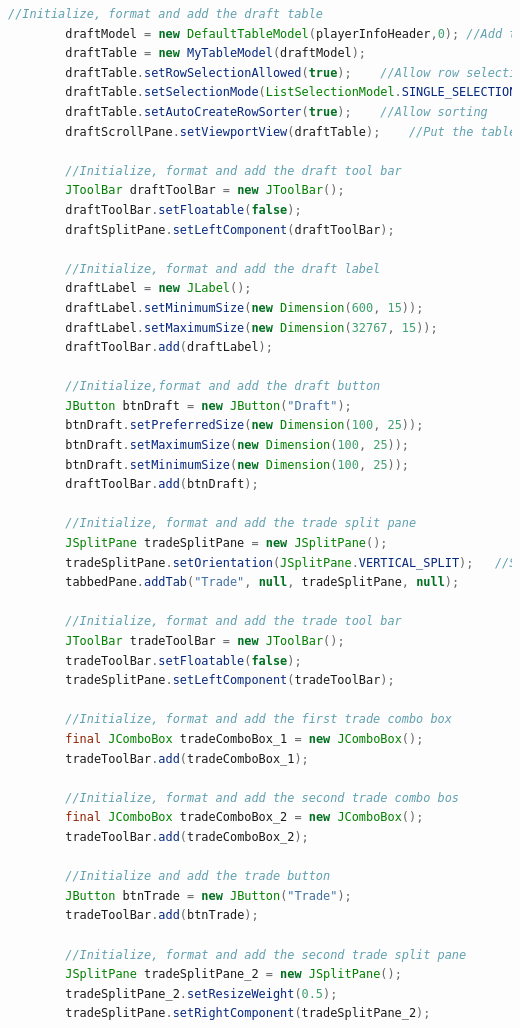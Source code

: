 \documentclass[12pt]{report}
\begin{document}
\begin{singlespace}
\begin{lstlisting}[language=Java,label=some-code,caption={GUI.java}]
		//Initialize, format and add the draft table
		draftModel = new DefaultTableModel(playerInfoHeader,0);	//Add the header but no rows
		draftTable = new MyTableModel(draftModel);
		draftTable.setRowSelectionAllowed(true);	//Allow row selection
		draftTable.setSelectionMode(ListSelectionModel.SINGLE_SELECTION);	//Allow only one row selection at a time
		draftTable.setAutoCreateRowSorter(true);	//Allow sorting
		draftScrollPane.setViewportView(draftTable);	//Put the table into the scroll pane
		
		//Initialize, format and add the draft tool bar
		JToolBar draftToolBar = new JToolBar();
		draftToolBar.setFloatable(false);
		draftSplitPane.setLeftComponent(draftToolBar);
		
		//Initialize, format and add the draft label
		draftLabel = new JLabel();
		draftLabel.setMinimumSize(new Dimension(600, 15));
		draftLabel.setMaximumSize(new Dimension(32767, 15));
		draftToolBar.add(draftLabel);
		
		//Initialize,format and add the draft button
		JButton btnDraft = new JButton("Draft");
		btnDraft.setPreferredSize(new Dimension(100, 25));
		btnDraft.setMaximumSize(new Dimension(100, 25));
		btnDraft.setMinimumSize(new Dimension(100, 25));
		draftToolBar.add(btnDraft);
		
		//Initialize, format and add the trade split pane
		JSplitPane tradeSplitPane = new JSplitPane();
		tradeSplitPane.setOrientation(JSplitPane.VERTICAL_SPLIT);	//Split vertically
		tabbedPane.addTab("Trade", null, tradeSplitPane, null);
		
		//Initialize, format and add the trade tool bar
		JToolBar tradeToolBar = new JToolBar();
		tradeToolBar.setFloatable(false);
		tradeSplitPane.setLeftComponent(tradeToolBar);
		
		//Initialize, format and add the first trade combo box
		final JComboBox tradeComboBox_1 = new JComboBox();
		tradeToolBar.add(tradeComboBox_1);
		
		//Initialize, format and add the second trade combo bos
		final JComboBox tradeComboBox_2 = new JComboBox();
		tradeToolBar.add(tradeComboBox_2);
		
		//Initialize and add the trade button
		JButton btnTrade = new JButton("Trade");
		tradeToolBar.add(btnTrade);
		
		//Initialize, format and add the second trade split pane
		JSplitPane tradeSplitPane_2 = new JSplitPane();
		tradeSplitPane_2.setResizeWeight(0.5);
		tradeSplitPane.setRightComponent(tradeSplitPane_2);
		

\end{lstlisting}
\end{singlespace}
\end{document}
